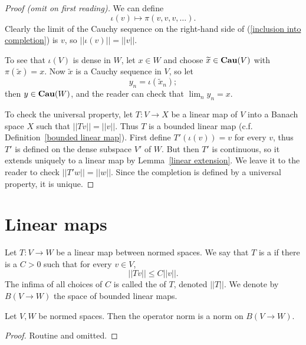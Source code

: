 \begin{proof}[Proof (omit on first reading)]
We can define
\begin{equation}\label{inclusion into completion}
\iota(v) \mapsto \pi(v, v, v, \dots).
\end{equation}
Clearly the limit of the Cauchy sequence on the right-hand side of (\ref{inclusion into completion}) is $v$, so $||\iota(v)|| = ||v||$.

To see that $\iota(V)$ is dense in $W$, let $x \in W$ and choose $\widetilde{x} \in \mathbf{Cau} (V)$ with $\pi(\widetilde{x}) = x$.
Now $\widetilde{x}$ is a Cauchy sequence in $V$, so let
\[y_{n} = \iota(\widetilde{x}_{n});\]
then $y \in \mathbf{Cau} (W)$, and the reader can check that $\lim_{n} y_{n} = x$.

To check the universal property, let $T: V \to X$ be a linear map of $V$ into a Banach space $X$ such that $||Tv|| = ||v||$.
Thus $T$ is a bounded linear map (c.f. Definition~\ref{bounded linear map}). First define $T'(\iota(v)) = v$ for every $v$, thus $T'$ is defined on the dense subspace $V'$ of $W$.
But then $T'$ is continuous, so it extends uniquely to a linear map by Lemma~\ref{linear extension}. We leave it to the reader to check $||T'w|| = ||w||$.
Since the completion is defined by a universal property, it is unique.
\end{proof}

\section{Linear maps}
\begin{definition}\label{bounded linear map}
Let $T: V\to W$ be a linear map between normed spaces. We say that $T$ is a  if there is a $C>0$ such that for every $v \in V$,
\[||Tv|| \leq C||v||.\]
The infima of all choices of $C$ is called the  of $T$, denoted $||T||$.
We denote by $B(V \to W)$ the space of bounded linear maps.
\end{definition}

\begin{lemma}
Let $V,W$ be normed spaces.
Then the operator norm is a norm on $B(V \to W)$.
\end{lemma}
\begin{proof}
Routine and omitted.
\end{proof}

